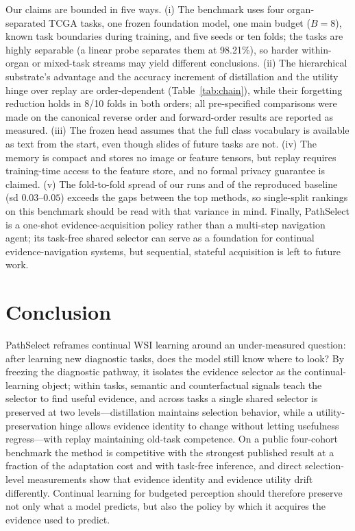\documentclass{article}
\begin{document}
Our claims are bounded in five ways. (i) The benchmark uses four organ-separated TCGA tasks, one frozen foundation model, one main budget ($B=8$), known task boundaries during training, and five seeds or ten folds; the tasks are highly separable (a linear probe separates them at 98.21\%), so harder within-organ or mixed-task streams may yield different conclusions. (ii) The hierarchical substrate's advantage and the accuracy increment of distillation and the utility hinge over replay are order-dependent (Table~\ref{tab:chain}), while their forgetting reduction holds in 8/10 folds in both orders; all pre-specified comparisons were made on the canonical reverse order and forward-order results are reported as measured. (iii) The frozen head assumes that the full class vocabulary is available as text from the start, even though slides of future tasks are not. (iv) The memory is compact and stores no image or feature tensors, but replay requires training-time access to the feature store, and no formal privacy guarantee is claimed. (v) The fold-to-fold spread of our runs and of the reproduced baseline (sd $0.03$--$0.05$) exceeds the gaps between the top methods, so single-split rankings on this benchmark should be read with that variance in mind. Finally, PathSelect is a one-shot evidence-acquisition policy rather than a multi-step navigation agent; its task-free shared selector can serve as a foundation for continual evidence-navigation systems, but sequential, stateful acquisition is left to future work.

\section{Conclusion}

PathSelect reframes continual WSI learning around an under-measured question: after learning new diagnostic tasks, does the model still know where to look? By freezing the diagnostic pathway, it isolates the evidence selector as the continual-learning object; within tasks, semantic and counterfactual signals teach the selector to find useful evidence, and across tasks a single shared selector is preserved at two levels---distillation maintains selection behavior, while a utility-preservation hinge allows evidence identity to change without letting usefulness regress---with replay maintaining old-task competence. On a public four-cohort benchmark the method is competitive with the strongest published result at a fraction of the adaptation cost and with task-free inference, and direct selection-level measurements show that evidence identity and evidence utility drift differently. Continual learning for budgeted perception should therefore preserve not only what a model predicts, but also the policy by which it acquires the evidence used to predict.



\end{document}
